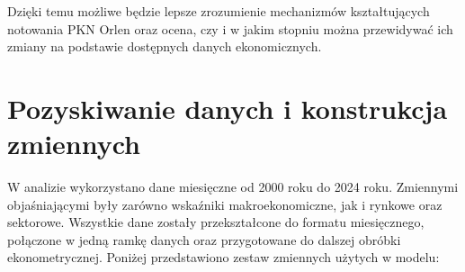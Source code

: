 \documentclass[12pt, twoside]{article}
\begin{document}
Dzięki temu możliwe będzie lepsze zrozumienie mechanizmów kształtujących notowania PKN Orlen oraz ocena, czy i w jakim stopniu można przewidywać ich zmiany na podstawie dostępnych danych ekonomicznych.

\section{Pozyskiwanie danych i konstrukcja zmiennych}

W analizie wykorzystano dane miesięczne od 2000 roku do 2024 roku. Zmiennymi objaśniającymi były zarówno wskaźniki makroekonomiczne, jak i rynkowe oraz sektorowe. Wszystkie dane zostały przekształcone do formatu miesięcznego, połączone w jedną ramkę danych oraz przygotowane do dalszej obróbki ekonometrycznej. Poniżej przedstawiono zestaw zmiennych użytych w modelu:
\end{document}
